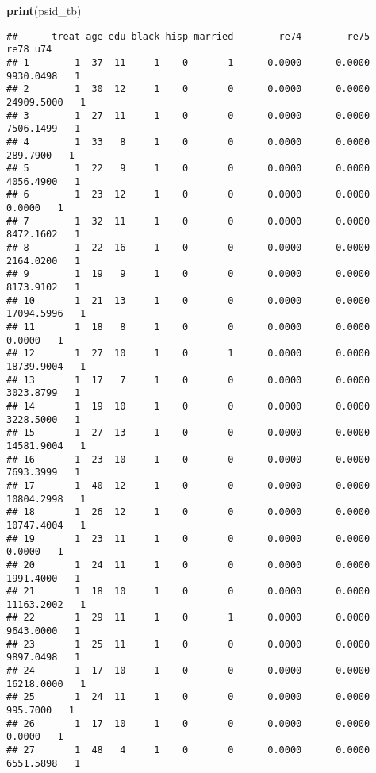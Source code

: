 \documentclass[
]{article}
\newenvironment{Shaded}{\begin{snugshade}}{\end{snugshade}}
\newcommand{\FunctionTok}[1]{\textcolor[rgb]{0.13,0.29,0.53}{\textbf{#1}}}
\newcommand{\NormalTok}[1]{#1}
\begin{document}
\begin{enumerate}
\begin{Shaded}
\begin{Highlighting}[]
\FunctionTok{print}\NormalTok{(psid\_tb)}
\end{Highlighting}
\end{Shaded}

\begin{verbatim}
##      treat age edu black hisp married        re74        re75        re78 u74
## 1        1  37  11     1    0       1      0.0000      0.0000   9930.0498   1
## 2        1  30  12     1    0       0      0.0000      0.0000  24909.5000   1
## 3        1  27  11     1    0       0      0.0000      0.0000   7506.1499   1
## 4        1  33   8     1    0       0      0.0000      0.0000    289.7900   1
## 5        1  22   9     1    0       0      0.0000      0.0000   4056.4900   1
## 6        1  23  12     1    0       0      0.0000      0.0000      0.0000   1
## 7        1  32  11     1    0       0      0.0000      0.0000   8472.1602   1
## 8        1  22  16     1    0       0      0.0000      0.0000   2164.0200   1
## 9        1  19   9     1    0       0      0.0000      0.0000   8173.9102   1
## 10       1  21  13     1    0       0      0.0000      0.0000  17094.5996   1
## 11       1  18   8     1    0       0      0.0000      0.0000      0.0000   1
## 12       1  27  10     1    0       1      0.0000      0.0000  18739.9004   1
## 13       1  17   7     1    0       0      0.0000      0.0000   3023.8799   1
## 14       1  19  10     1    0       0      0.0000      0.0000   3228.5000   1
## 15       1  27  13     1    0       0      0.0000      0.0000  14581.9004   1
## 16       1  23  10     1    0       0      0.0000      0.0000   7693.3999   1
## 17       1  40  12     1    0       0      0.0000      0.0000  10804.2998   1
## 18       1  26  12     1    0       0      0.0000      0.0000  10747.4004   1
## 19       1  23  11     1    0       0      0.0000      0.0000      0.0000   1
## 20       1  24  11     1    0       0      0.0000      0.0000   1991.4000   1
## 21       1  18  10     1    0       0      0.0000      0.0000  11163.2002   1
## 22       1  29  11     1    0       1      0.0000      0.0000   9643.0000   1
## 23       1  25  11     1    0       0      0.0000      0.0000   9897.0498   1
## 24       1  17  10     1    0       0      0.0000      0.0000  16218.0000   1
## 25       1  24  11     1    0       0      0.0000      0.0000    995.7000   1
## 26       1  17  10     1    0       0      0.0000      0.0000      0.0000   1
## 27       1  48   4     1    0       0      0.0000      0.0000   6551.5898   1

\end{verbatim}
\end{enumerate}
\end{document}
